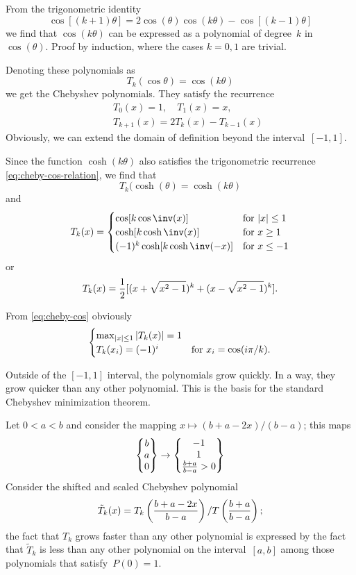 From the trigonometric identity
\begin{equation}
 \cos[(k+1)\theta]=2\cos(\theta)\cos(k\theta) -\cos[(k-1)\theta]
 \label{eq:cheby-cos-relation}\end{equation}
we find that $\cos(k\theta)$ can be expressed as a polynomial of degree~$k$
in~$\cos(\theta)$. Proof by induction, where the cases $k=0,1$ are
trivial.

Denoting these polynomials as
\begin{equation}
    T_k(\cos\theta)=\cos(k\theta)
    \label{eq:cheby-cos}\end{equation}
we get the Chebyshev polynomials. They satisfy the recurrence
\begin{eqnarray*}
&&T_0(x)=1,\quad T_1(x)=x,\\
&&T_{k+1}(x)=2T_k(x)-T_{k-1}(x)
\end{eqnarray*}
Obviously, we can extend the domain of definition beyond the
interval~$[-1,1]$.

Since the function $\cosh(k\theta)$ also satisfies the trigonometric
recurrence \eqref{eq:cheby-cos-relation}, we find that
\[ T_k(\cosh(\theta)=\cosh(k\theta) \]
and
\[ T_k(x)=
  \begin{cases}
    \cos[k\cos\inv(x)]&\hbox{for $|x|\leq1$}\cr
    \cosh[k\cosh\inv(x)]&\hbox{for $x\geq1$}\cr
    (-1)^k\cosh[k\cosh\inv(-x)]&\hbox{for $x\leq-1$}\cr
  \end{cases} 
\]
or
\[ T_k(x) = {1\over 2}[(x+\sqrt{x^2-1})^k+(x-\sqrt{x^2-1})^k]. \]

From \eqref{eq:cheby-cos} obviously
\[ \begin{cases}\max_{|x|\leq1}|T_k(x)|=1\cr
    T_k(x_i)=(-1)^i&\hbox{for $x_i=\cos(i\pi/k)$.}\end{cases} \]

Outside of the $[-1,1]$ interval, the polynomials grow quickly. In a
way, they grow quicker than any other polynomial. This is the basis
for the standard Chebyshev minimization theorem.

Let $0<a<b$ and consider the mapping $x\mapsto(b+a-2x)/(b-a)$; this
maps
\[ \left\{\begin{matrix}b\cr a\cr 0\end{matrix}\right\}\rightarrow
    \left\{\begin{matrix}-1\cr 1\cr {b+a\over b-a}>0\end{matrix}\right\} \]
Consider the shifted and scaled Chebyshev polynomial
\[ \tilde T_k(x)=T_k\left({b+a-2x\over b-a}\right)
      /T\left({b+a\over b-a}\right); \]
the fact that $T_k$ grows faster than any other polynomial is
expressed by the fact that $\tilde T_k$ is less than any other
polynomial on the interval~$[a,b]$ among those polynomials that
satisfy~$P(0)=1$.


